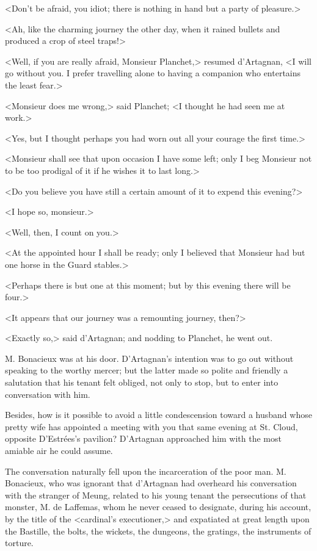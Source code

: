 <Don't be afraid, you idiot; there is nothing in hand but a party of pleasure.> 

<Ah, like the charming journey the other day, when it rained bullets and produced a crop of steel traps!> 

<Well, if you are really afraid, Monsieur Planchet,> resumed d'Artagnan, <I will go without you. I prefer travelling alone to having a companion who entertains the least fear.> 

<Monsieur does me wrong,> said Planchet; <I thought he had seen me at work.> 

<Yes, but I thought perhaps you had worn out all your courage the first time.> 

<Monsieur shall see that upon occasion I have some left; only I beg Monsieur not to be too prodigal of it if he wishes it to last long.> 

<Do you believe you have still a certain amount of it to expend this evening?> 

<I hope so, monsieur.> 

<Well, then, I count on you.> 

<At the appointed hour I shall be ready; only I believed that Monsieur had but one horse in the Guard stables.> 

<Perhaps there is but one at this moment; but by this evening there will be four.> 

<It appears that our journey was a remounting journey, then?> 

<Exactly so,> said d'Artagnan; and nodding to Planchet, he went out. 

M. Bonacieux was at his door. D'Artagnan's intention was to go out without speaking to the worthy mercer; but the latter made so polite and friendly a salutation that his tenant felt obliged, not only to stop, but to enter into conversation with him. 

Besides, how is it possible to avoid a little condescension toward a husband whose pretty wife has appointed a meeting with you that same evening at St. Cloud, opposite D'Estrées's pavilion? D'Artagnan approached him with the most amiable air he could assume. 

The conversation naturally fell upon the incarceration of the poor man. M. Bonacieux, who was ignorant that d'Artagnan had overheard his conversation with the stranger of Meung, related to his young tenant the persecutions of that monster, M. de Laffemas, whom he never ceased to designate, during his account, by the title of the <cardinal's executioner,> and expatiated at great length upon the Bastille, the bolts, the wickets, the dungeons, the gratings, the instruments of torture. 

